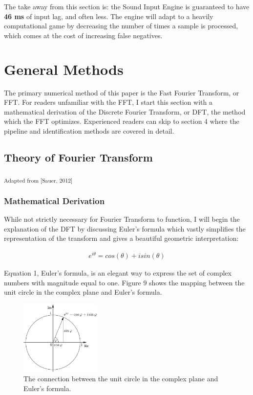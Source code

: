 \documentclass[DIV=calc, paper=a4, fontsize=11pt, twocolumn]{scrartcl}   %
\begin{document}
\par The take away from this section is: the Sound Input Engine is guaranteed to  have \textbf{46 ms} of input lag, and often less. The engine will adapt to a heavily computational game by decreasing the number of times a sample is processed, which comes at the cost of increasing false negatives.


\section{General Methods}
The primary numerical method of this paper is the Fast Fourier Transform, or FFT. For readers unfamiliar with the FFT, I start this section with a mathematical derivation of the Discrete Fourier Transform, or DFT, the method which the FFT optimizes. Experienced readers can skip to section 4 where the pipeline and identification methods are covered in detail.
\subsection{Theory of Fourier Transform}
\textsubscript{Adapted from [Sauer, 2012]}
\subsubsection{Mathematical Derivation}

While not strictly necessary for Fourier Transform to function, I will begin the explanation of the DFT by discussing Euler's formula which vastly simplifies the representation of the transform and gives a beautiful geometric interpretation:

\begin{align}
e^{i\theta} = cos(\theta) + isin(\theta)
\end{align}

Equation 1, Euler's formula, is an elegant way to express the set of complex numbers with magnitude equal to one. Figure 9 shows the mapping between the unit circle in the complex plane and Euler's formula.

\begin{figure}[h]
\centering
\includegraphics[width=40mm]{figures/EulersFormula.png}
\caption{The connection between the unit circle in the complex plane and Euler's formula. }
\label{overflow}
\end{figure}
\end{document}
